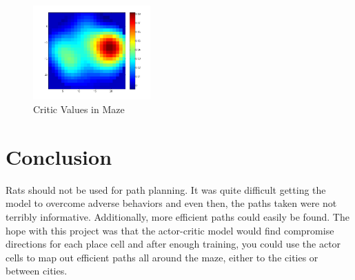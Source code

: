 \documentclass[conference]{IEEEtran}
\begin{document}
\begin{figure}
\includegraphics[width=0.4\textwidth]{waterMazeRevisedD_Critic_populationRewards.png} 
\caption{Critic Values in Maze}
\end{figure}

\section{Conclusion}
Rats should not be used for path planning. It was quite difficult getting the model to overcome adverse behaviors and even then, the paths taken were not terribly informative. Additionally, more efficient paths could easily be found. The hope with this project was that the actor-critic model would find compromise directions for each place cell and after enough training, you could use the actor cells to map out efficient paths all around the maze, either to the cities or between cities. 






\end{document}
